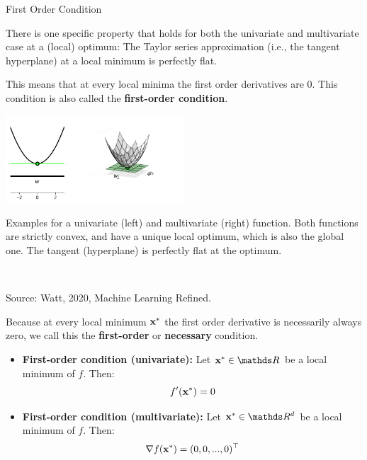   \begin{vbframe}{First Order Condition}
  
  There is one specific property that holds for both the univariate and multivariate case at a (local) optimum: The Taylor series approximation (i.e., the tangent hyperplane) at a local minimum is perfectly flat. 
  
  \vspace*{0.2cm}
  
  This means that at every local minima the first order derivatives are $0$. This condition is also called the \textbf{first-order condition}. 
  
  
  \begin{center}
  \includegraphics[width = 0.5\textwidth]{figure_man/first_order.png} \\
  \begin{footnotesize}
  Examples for a univariate (left) and multivariate (right) function. Both functions are strictly convex, and have a unique local optimum, which is also the global one. The tangent (hyperplane) is perfectly flat at the optimum. \end{footnotesize}\\
  \begin{tiny}
  Source: Watt, 2020, Machine Learning Refined. 
  \end{tiny}
  \end{center}
  
  \framebreak 
  
  Because at every local minimum $\mathbf{x}^\ast$ the first order derivative is necessarily always zero, we call this the \textbf{first-order} or \textbf{necessary} condition. 
  
  \begin{itemize}
    \item \textbf{First-order condition (univariate): } Let $\xv^\ast \in \R$ be a local minimum of $f$. Then:
    $$
    f'(\mathbf{x}^\ast) = 0
    $$
    \item \textbf{First-order condition (multivariate): } Let $\xv^\ast \in \R^d$ be a local minimum of $f$. Then:
    $$
    \nabla f(\mathbf{x}^\ast) = (0, 0, ..., 0)^\top
    $$
  

\end{itemize}
\end{vbframe}
